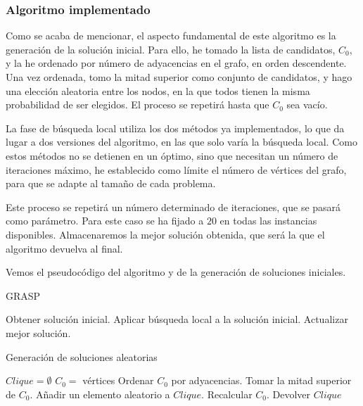 \subsubsection{Algoritmo implementado}

Como se acaba de mencionar, el aspecto fundamental de este algoritmo es la generación de
la solución inicial. Para ello, he tomado la lista de candidatos, $C_0$, y la he ordenado
por número de adyacencias en el grafo, en orden descendente. Una vez ordenada, tomo la
mitad superior como conjunto de candidatos, y hago una elección aleatoria entre los nodos,
en la que todos tienen la misma probabilidad de ser elegidos. El proceso se repetirá hasta
que $C_0$ sea vacío.

La fase de búsqueda local utiliza los dos métodos ya implementados, lo que da lugar a
dos versiones del algoritmo, en las que solo varía la búsqueda local. Como estos métodos
no se detienen en un óptimo, sino que necesitan un número de iteraciones máximo, he
establecido como límite el número de vértices del grafo, para que se adapte al tamaño
de cada problema.

Este proceso se repetirá un número determinado de iteraciones, que se pasará como parámetro.
Para este caso se ha fijado a $20$ en todas las instancias disponibles. Almacenaremos la
mejor solución obtenida, que será la que el algoritmo devuelva al final.

Vemos el pseudocódigo del algoritmo y de la generación de soluciones iniciales.

\begin{algorithm}[H]
\caption{GRASP}
  \begin{algorithmic}
  \Repeat
    \State Obtener solución inicial.
    \State Aplicar búsqueda local a la solución inicial.
    \State Actualizar mejor solución.
  \end{algorithmic}
\end{algorithm}

\begin{algorithm}[H]
\caption{Generación de soluciones aleatorias}
  \begin{algorithmic}
    \State $Clique = \emptyset$
    \State $C_0 =$ vértices
    \Repeat
      \State Ordenar $C_0$ por adyacencias.
      \State Tomar la mitad superior de $C_0$.
      \State Añadir un elemento aleatorio a $Clique$.
      \State Recalcular $C_0$.
    \State Devolver $Clique$
  \end{algorithmic}
\end{algorithm}


